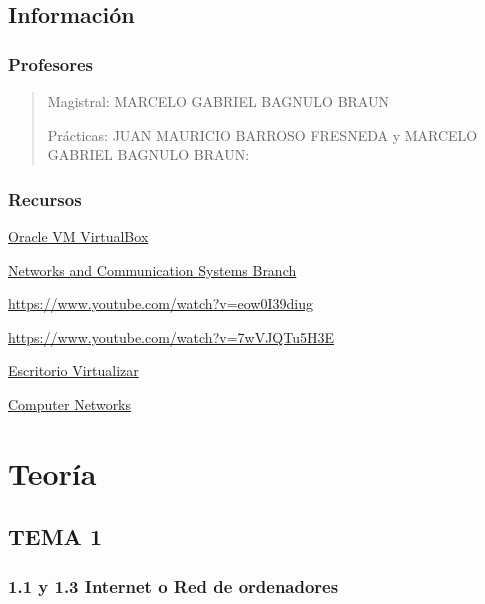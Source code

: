 \documentclass[12pt, twoside, openright]{report} %
\begin{document}
\listoffigures
\thispagestyle{fancy}





\chapter{Información}
\section{Profesores}
\begin{quote}
	Magistral: MARCELO GABRIEL BAGNULO BRAUN

	Prácticas: JUAN MAURICIO BARROSO FRESNEDA y MARCELO GABRIEL BAGNULO BRAUN:
\end{quote}

\section{Recursos}

\href{https://www.virtualbox.org/}{Oracle VM VirtualBox}

\href{https://www.nrl.navy.mil/itd/ncs/products/core}{Networks and
	Communication Systems Branch}

\url{https://www.youtube.com/watch?v=eow0I39diug}

\url{https://www.youtube.com/watch?v=7wVJQTu5H3E}

\href{http://www.ingebook.com/ib/NPcd/IB_Escritorio_Visualizar?cod_primaria=1000193\&libro=6752}{Escritorio Virtualizar}

\href{https://padlet.com/fvalera/8njxmoxyj4qgck6d}{Computer Networks}


\part{Teoría}
\chapter{TEMA 1}

\section{1.1 y 1.3 Internet o Red de ordenadores}
\end{document}
